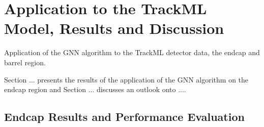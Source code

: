 
\chapter{Application to the TrackML Model, Results and Discussion}
\label{chapter-7}


Application of the GNN algorithm to the TrackML detector data, the endcap and barrel region.

Section ... presents the results of the application of the GNN algorithm on the endcap region and Section ... discusses an outlook onto ....




\section{Endcap Results and Performance Evaluation}




